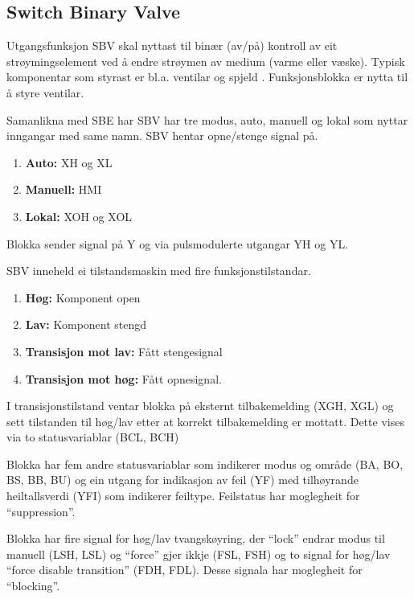 \subsection{Switch Binary Valve}

Utgangsfunksjon \gls{SBV} skal nyttast til binær (av/på) kontroll av eit strøymingselement ved å endre strøymen av medium (varme eller væske). 
Typisk komponentar som styrast er bl.a. ventilar og spjeld \citep{IEC-63131}.
Funksjonsblokka er nytta til å styre ventilar.

Samanlikna med \gls{SBE} har \gls{SBV} har tre modus, auto, manuell og lokal som nyttar inngangar med same namn.
\gls{SBV} hentar opne/stenge signal på.
\begin{enumerate}
    \item \textbf{Auto:}        XH og XL  
    \item \textbf{Manuell:}     HMI
    \item \textbf{Lokal:}       XOH og XOL
\end{enumerate}
Blokka sender signal på Y og via pulsmodulerte utgangar YH og YL.

\gls{SBV} inneheld ei tilstandsmaskin med fire funksjonstilstandar. 
\begin{enumerate}
    \item \textbf{Høg:}                 Komponent open
    \item \textbf{Lav:}                 Komponent stengd
    \item \textbf{Transisjon mot lav:}  Fått stengesignal
    \item \textbf{Transisjon mot høg:}  Fått opnesignal.
\end{enumerate}

I transisjonstilstand ventar blokka på eksternt tilbakemelding (XGH, XGL) 
og sett tilstanden til høg/lav etter at korrekt tilbakemelding er mottatt.
Dette vises via to statusvariablar (BCL, BCH)

Blokka har fem andre statusvariablar som indikerer modus og område (BA, BO, BS, BB, BU) og
ein utgang for indikasjon av feil (YF) med tilhøyrande heiltallsverdi (YFI) som indikerer feiltype. \newline
Feilstatus har moglegheit for ``suppression''.

Blokka har fire signal for høg/lav tvangskøyring, der ``lock'' endrar modus til manuell (LSH, LSL) og ``force'' gjer ikkje (FSL, FSH)
og to signal for høg/lav ``force disable transition'' (FDH, FDL). \newline
Desse signala har moglegheit for ``blocking''.

